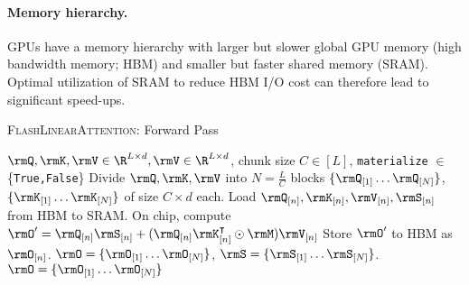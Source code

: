\paragraph{Memory hierarchy.} GPUs have a memory hierarchy with larger but slower global GPU memory (high bandwidth memory; HBM) and smaller but faster shared memory (SRAM). Optimal utilization of SRAM to reduce HBM I/O cost can therefore lead to significant speed-ups.

\begin{algorithm}[t!]
\vspace{-0.5mm}
\scriptsize
\caption{\textsc{FlashLinearAttention}: Forward Pass}
\label{algo:la-chunk-fwd}
\begin{algorithmic}
    \Require $\rmQ, \rmK, \rmV \in \R^{L \times d}, \rmV  \in \R^{L \times d}$, chunk size $C \in [L]$, \texttt{materialize} $\in$ \{\texttt{True,False}\} 
    \State Divide $\rmQ, \rmK, \rmV$ into $N = \frac{L}{C}$ blocks $\{ \rmQ_{[1]} \dots \rmQ_{[N]} \} $, $\{ \rmK_{[1]} \dots \rmK_{[N]} \}$ of size $C \times d$ each.
     
        \color{black}
    \EndFor
        \State Load $\rmQ_{[n]}, \rmK_{[n]}, \rmV_{[n]}, \rmS_{[n]}$ from HBM to SRAM.
        \State On chip, compute $\rmO^{\prime} = \rmQ_{[n]} \rmS_{[n]} + (\rmQ_{[n]} \rmK^\intercal_{[n]} \odot \rmM)\rmV_{[n]}$  
        \State Store $\rmO^{\prime}$ to HBM as $\rmO_{[n]}$.
    \EndParFor
  \State \Return $\rmO = \{ \rmO_{[1]} \dots \rmO_{[N]} \}$, $\rmS=\{ \rmS_{[1]} \dots \rmS_{[N]} \}$.
        \Else {}
      \color{black}
        \color{black}
    \EndFor
   \State  \Return $\rmO = \{ \rmO_{[1]} \dots \rmO_{[N]} \}$   
\EndIf 
\vspace{-0.5mm}
\end{algorithmic}
\end{algorithm}

